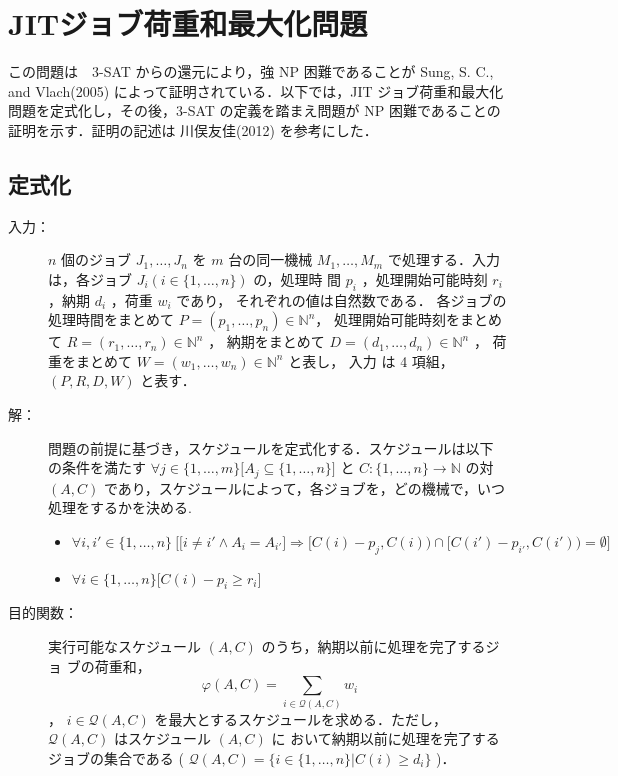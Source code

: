 \documentclass[12pt]{optlab-bachelor}
\begin{document}
\section{JITジョブ荷重和最大化問題}
この問題は　3-SAT からの還元により，強 NP 困難であることが Sung, S. C., and Vlach(2005) \cite{JIT}
によって証明されている．以下では，JIT ジョブ荷重和最大化問題を定式化し，その後，3-SAT の定義を踏まえ問題が NP 困難であることの証明を示す．証明の記述は 川俣友佳(2012)\cite{kawamata}
を参考にした．
\subsection{定式化}
\begin{description}
  \item[入力：] $n$ 個のジョブ $J_1,\ldots,J_n$ を $m$ 台の同一機械 $M_1,\ldots,M_m$
  で処理する．入力は，各ジョブ $J_i ( i \in \{1,\ldots,n\} )$ の，処理時
  間 $p_i$ ，処理開始可能時刻 $r_i$ ，納期 $d_i$ ，荷重 $w_i$ であり，
  それぞれの値は自然数である．
  各ジョブの処理時間をまとめて $P = (p_1,\ldots,p_n) \in \mathbb{N}^n$，
  処理開始可能時刻をまとめて $R = (r_1,\ldots,r_n) \in \mathbb{N}^n$ ，
  納期をまとめて $D = (d_1,\ldots,d_n) \in \mathbb{N}^n$ ，
  荷重をまとめて $W = (w_1,\ldots,w_n) \in \mathbb{N}^n$ と表し，
  入力 は 4 項組，$(P,R,D,W)$ と表す．
  \item[解：] 問題の前提に基づき，スケジュールを定式化する．スケジュールは以下
  の条件を満たす $\forall j \in \{1,\ldots,m\}\big[A_j \subseteq
  \{1,\ldots,n\}\big]$ と $C : \{1,\ldots,n\} \to \mathbb{N}$ の対 $(A,
  C)$ であり，スケジュールによって，各ジョブを，どの機械で，いつ処理をするかを決める.
  \begin{itemize}
    \item {\small $\forall i, i' \in \{1,\ldots,n\}\ \Big[ \big[i \neq i' \land A_i = A_{i'}\big] \Rightarrow [C(i) - p_j, C(i)) \cap [C(i') - p_{i'}, C(i')) = \emptyset \Big]$}
    \item  $\forall i \in \{1,\ldots,n\}\big[C(i) - p_i \ge r_i\big]$
  \end{itemize}
  \item[目的関数：] 実行可能なスケジュール $(A, C)$ のうち，納期以前に処理を完了するジョ
  ブの荷重和，
  $$\displaystyle \varphi(A,C) = \sum_{i \in \mathcal{Q}(A,C)}w_i$$，
  $i \in \mathcal{Q}(A,C)$ を最大とするスケジュールを求める．ただし，
  $\mathcal{Q}(A, C)$ はスケジュール $(A, C)$ に
  おいて納期以前に処理を完了するジョブの集合である (
  $\mathcal{Q}(A, C) = \{i \in \{1,\ldots, n\} | C(i) \ge d_i \}$ )．
\end{description}
\end{document}
